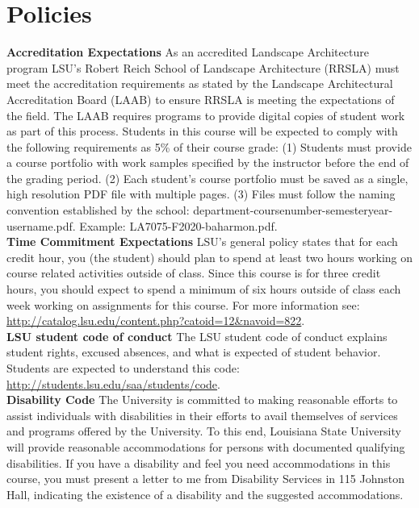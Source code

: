 \documentclass[11pt,article,oneside]{memoir}
\begin{document}
\section{Policies}

\noindent \textbf{Accreditation Expectations}
As an accredited Landscape Architecture program
LSU's Robert Reich School of Landscape Architecture (RRSLA) 
must meet the accreditation requirements 
as stated by the Landscape Architectural Accreditation
Board (LAAB) to ensure RRSLA is meeting the expectations of the field. 
The LAAB requires programs to provide digital copies 
of student work as part of this process.
Students in this course will be expected 
to comply with the following requirements
as 5\% of their course grade: 
(1) Students must provide a course portfolio
with work samples specified by the instructor 
before the end of the grading period. 
(2) Each student's course portfolio must be saved as 
a single, high resolution PDF file with multiple pages. 
(3) Files must follow the naming convention
established by the school: department-coursenumber-semesteryear-username.pdf.
Example: LA7075-F2020-baharmon.pdf.\\

\noindent \textbf{Time Commitment Expectations}
LSU's general policy states that for each credit hour, you (the student) should plan to
spend at least two hours working on course related activities outside of class. Since this course is for three credit hours, you should expect to spend a minimum of six hours outside of class each week working on assignments for this course. For more information see: 
\url{http://catalog.lsu.edu/content.php?catoid=12&navoid=822}.\\

\noindent \textbf{LSU student code of conduct}
The LSU student code of conduct explains student rights, excused absences, and what is expected of student behavior. Students are expected to understand this code:  \url{http://students.lsu.edu/saa/students/code}.\\ %

\noindent \textbf{Disability Code}
The University is committed to making reasonable efforts to assist individuals with disabilities in
their efforts to avail themselves of services and programs offered by the University. To this end,
Louisiana State University will provide reasonable accommodations for persons with
documented qualifying disabilities. If you have a disability and feel you need accommodations in
this course, you must present a letter to me from Disability Services in 115 Johnston Hall,
indicating the existence of a disability and the suggested accommodations.\\
\end{document}
